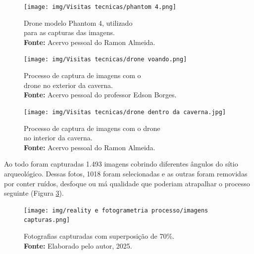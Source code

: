 \begin{figure}[H]
    \centering
    \begin{minipage}{0.45\textwidth} %
        \centering
    \texttt{[image: img/Visitas tecnicas/phantom 4.png]}
    \caption{ Drone modelo Phantom 4, utilizado \\ para as capturas das imagens.\\
        \textbf{Fonte:} Acervo pessoal do Ramon Almeida.}
    \label{fig:phantom 4}   
    \end{minipage}
    \hspace{1cm} %
    \begin{minipage}{0.45\textwidth} %
        \centering
        \texttt{[image: img/Visitas tecnicas/drone voando.png]}
        \caption{Processo de captura de imagens com o \\ drone no exterior da caverna.\\
            \textbf{Fonte:} Acervo pessoal do professor Edson Borges.}
        \label{fig:drone voando}
    \end{minipage}
\end{figure}

\begin{figure}[H]
    \centering
        \texttt{[image: img/Visitas tecnicas/drone dentro da caverna.jpg]}
        \caption{Processo de captura de imagens com o drone \\
        no interior da caverna. \\
            \textbf{Fonte:} Acervo pessoal do Ramon Almeida.}
        \label{fig:drone dentro da caverna}
\end{figure}

 Ao todo foram capturadas 1.493 imagens cobrindo diferentes ângulos do sítio arqueológico. Dessas fotos, 1018 foram selecionadas e as outras foram removidas por conter ruídos, desfoque ou má qualidade que poderiam atrapalhar o processo seguinte (Figura \ref{fig:fotos tiradas}).

\begin{figure}[H]
    \centering
    \texttt{[image: img/reality e fotogrametria processo/imagens capturas.png]}
    \caption{Fotografias capturadas com superposição de 70\%.\\
        \textbf{Fonte:} Elaborado pelo autor, 2025.}
    \label{fig:fotos tiradas}   
\end{figure}

